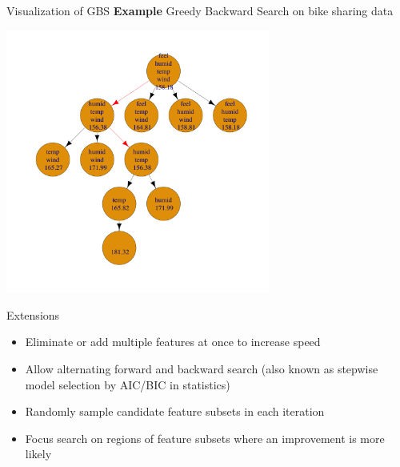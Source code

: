 \documentclass[11pt,compress,t,notes=noshow, xcolor=table]{beamer}
\begin{document}
  \begin{frame}{Visualization of GBS}
    \textbf{Example} Greedy Backward Search on bike sharing data
    \begin{center}
      \includegraphics[width = 0.65\textwidth]{figure/fs-wrappers-backwards-powerset-tree-4.png}
      \end{center}
\end{frame}

  \begin{vbframe}{Extensions}
    \vspace{-0.1cm}
    \begin{itemize}
      \setlength{\itemsep}{1.2em}
      \item Eliminate or add multiple features at once to increase speed
      \item Allow alternating forward and backward search (also known as stepwise model selection by AIC/BIC in statistics)
      \item Randomly sample candidate feature subsets in each iteration
      \item Focus search on regions of feature subsets where an improvement is more likely
    \end{itemize}
\end{vbframe}
\end{document}
